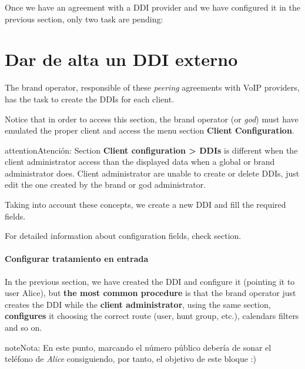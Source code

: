 \documentclass[letterpaper,10pt,spanish]{sphinxmanual}
\begin{document}
Once we have an agreement with a DDI provider and we have configured it in
the previous section, only two task are pending:


\section{Dar de alta un DDI externo}
\label{getting_started/external_incoming_calls/configure_ddi:settingup-ddi}\label{getting_started/external_incoming_calls/configure_ddi:configuring-an-external-ddi}\label{getting_started/external_incoming_calls/configure_ddi::doc}
The brand operator, responsible of these \emph{peering} agreements with VoIP providers,
has the task to create the DDIs for each client.

Notice that in order to access this section, the brand operator (or \emph{god})
must have emulated the proper client and access the menu section \textbf{Client
Configuration}.

\begin{notice}{attention}{Atención:}
Section \textbf{Client configuration \textgreater{} DDIs} is different when the
client administrator access than the displayed data when a global or brand
administrator does. Client administrator are unable to create or delete
DDIs, just edit the one created by the brand or god administrator.
\end{notice}

Taking into account these concepts, we create a new DDI and fill the required
fields.

For detailed information about configuration fields, check {\hyperref[administration_portal/client/vpbx/ddis:pbx\string-ddis]{}} section.
\paragraph{Configurar tratamiento en entrada}

In the previous section, we have created the DDI and configure it (pointing it to user Alice),
but \textbf{the most common procedure} is that the brand operator just creates the DDI while the
\textbf{client administrator}, using the same section, \textbf{configures} it choosing
the correct route (user, hunt group, etc.), calendars filters and so on.

\begin{notice}{note}{Nota:}
En este punto, marcando el número público debería de sonar el teléfono de \emph{Alice} consiguiendo, por tanto, el objetivo de este bloque :)
\end{notice}
\end{document}
